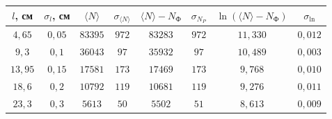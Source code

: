 \begin{tabular}{| c | c | c | c | c | c | c | c |}
\hline
$l$, см & $\sigma_l$, см & $\langle N \rangle$ & $\sigma_{\langle N \rangle}$ &
$\langle N \rangle-N_{\text{Ф}}$ & $\sigma_{N_P}$ & $\ln{(\langle N
\rangle-N_{\text{Ф}})}$ & $\sigma_{\ln}$\\
\hline
$4,65$ & $0,05$ & $83395$ & $972$ & $83283$ & $972$ & $11,330$ & $0,012$\\
\hline
$9,3$ & $0,1$ & $36043$ & $97$ & $35932$ & $97$ & $10,489$ & $0,003$\\
\hline
$13,95$ & $0,15$ & $17581$ & $173$ & $17469$ & $173$ & $9,768$ & $0,010$\\
\hline
$18,6$ & $0,2$ & $10792$ & $119$ & $10681$ & $119$ & $9,276$ & $0,011$\\
\hline
$23,3$ & $0,3$ & $5613$ & $50$ & $5502$ & $51$ & $8,613$ & $0,009$\\
\hline
\end{tabular}
